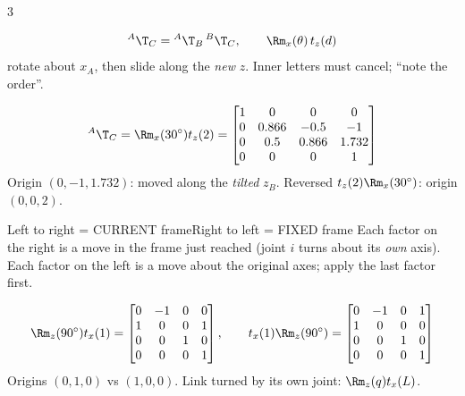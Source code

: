 \begin{multicols}{3}
\begin{fbx}[Compounding \pg{13}]
\[{}^A\T_C={}^A\T_B\,{}^B\T_C,\qquad \Rm_x(\theta)\,t_z(d)\]rotate about $x_A$, then slide along the \emph{new} $z$. 
Inner letters must cancel; ``note the order''.
\end{fbx}
\begin{worked}[slide: $\theta=30^\circ$, $d=2$ m]
\[{}^A\T_C=\Rm_x(30^\circ)t_z(2)=\begin{bmatrix}1&0&0&0\\0&0.866&-0.5&-1\\0&0.5&0.866&1.732\\0&0&0&1\end{bmatrix}\]
Origin $(0,-1,1.732)$: moved along the \emph{tilted} $z_B$. Reversed $t_z(2)\Rm_x(30^\circ)$: origin $(0,0,2)$. \chk
\end{worked}
\begin{twoway}{Left to right = CURRENT frame}{Right to left = FIXED frame}
Each factor on the right is a move in the frame just reached (joint $i$ turns about its \emph{own} axis).
\tcblower
Each factor on the left is a move about the original axes; apply the last factor first.
\end{twoway}
\begin{worked}
\[\Rm_z(90^\circ)t_x(1)=\begin{bmatrix}0&-1&0&0\\1&0&0&1\\0&0&1&0\\0&0&0&1\end{bmatrix},\qquad t_x(1)\Rm_z(90^\circ)=\begin{bmatrix}0&-1&0&1\\1&0&0&0\\0&0&1&0\\0&0&0&1\end{bmatrix}\]
Origins $(0,1,0)$ vs $(1,0,0)$. Link turned by its own joint: $\Rm_z(q)t_x(L)$. \chk
\end{worked}


\end{multicols}
